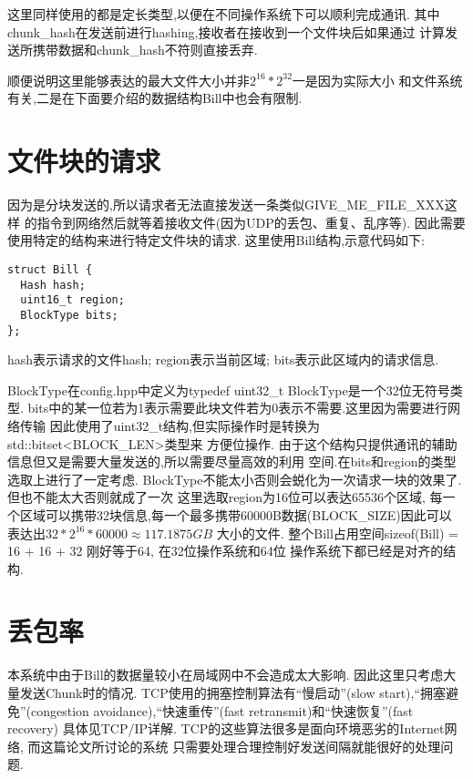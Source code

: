 这里同样使用的都是定长类型,以便在不同操作系统下可以顺利完成通讯.
其中chunk\_hash在发送前进行hashing,接收者在接收到一个文件块后如果通过
计算发送所携带数据和chunk\_hash不符则直接丢弃.

顺便说明这里能够表达的最大文件大小并非$2^{16}*2^{32}$一是因为实际大小
和文件系统有关,二是在下面要介绍的数据结构Bill中也会有限制.

\section{文件块的请求}
因为是分块发送的,所以请求者无法直接发送一条类似GIVE\_ME\_FILE\_XXX这样
的指令到网络然后就等着接收文件(因为UDP的丢包、重复、乱序等). 因此需要
使用特定的结构来进行特定文件块的请求.
这里使用Bill结构,示意代码如下:
\begin{lstlisting}
struct Bill {
  Hash hash;
  uint16_t region;
  BlockType bits;
};
\end{lstlisting}
hash表示请求的文件hash;
region表示当前区域;
bits表示此区域内的请求信息.

BlockType在config.hpp中定义为typedef uint32\_t BlockType是一个32位无符号类型.
bits中的某一位若为1表示需要此块文件若为0表示不需要.这里因为需要进行网络传输
因此使用了uint32\_t结构,但实际操作时是转换为std::bitset<BLOCK\_LEN>类型来
方便位操作. 
由于这个结构只提供通讯的辅助信息但又是需要大量发送的,所以需要尽量高效的利用
空间.在bits和region的类型选取上进行了一定考虑.
BlockType不能太小否则会蜕化为一次请求一块的效果了.但也不能太大否则就成了一次
这里选取region为16位可以表达65536个区域,
每一个区域可以携带32块信息,每一个最多携带60000B数据(BLOCK\_SIZE)因此可以
表达出$32 * 2^{16} * 60000 \approx 117.1875GB$ 大小的文件.
整个Bill占用空间sizeof(Bill) = 16 + 16 + 32 刚好等于64, 在32位操作系统和64位
操作系统下都已经是对齐的结构.

\section{丢包率}
本系统中由于Bill的数据量较小在局域网中不会造成太大影响.
因此这里只考虑大量发送Chunk时的情况.
TCP使用的拥塞控制算法有``慢启动''(slow start),``拥塞避免''(congestion
avoidance),``快速重传''(fast retransmit)和``快速恢复''(fast recovery)
具体见TCP/IP详解.
TCP的这些算法很多是面向环境恶劣的Internet网络, 而这篇论文所讨论的系统
只需要处理合理控制好发送间隔就能很好的处理问题.

